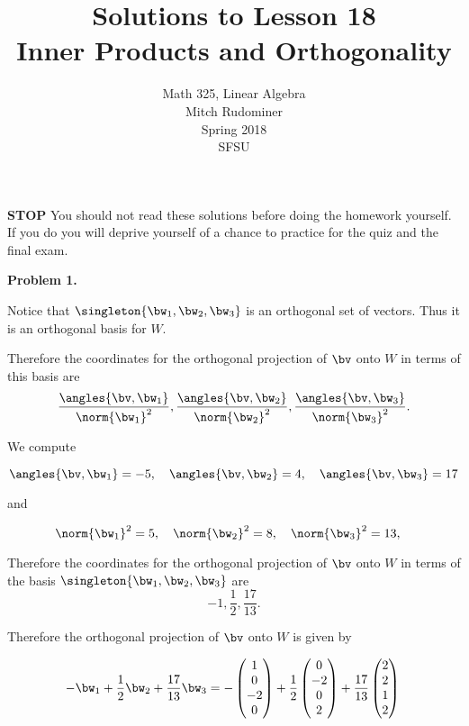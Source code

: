 \documentclass[oneside,12pt]{amsart}
\begin{document}
\title{Solutions to Lesson 18 \\ Inner Products and Orthogonality}
\author{Math 325, Linear Algebra \\ Mitch Rudominer \\ Spring 2018 \\ SFSU }
\date{}

\maketitle

\bigskip

\textbf{STOP} You should not read these solutions before doing the homework yourself.
If you do you will deprive yourself of a chance to practice for the quiz and the final exam.

\bigskip

\textbf{Problem 1.}

\bigskip

Notice that $\singleton{\bw_1,\bw_2,\bw_3}$ is an orthogonal set of vectors.
Thus it is an orthogonal basis for $W$.

Therefore the coordinates for the orthogonal projection of $\bv$ onto $W$ in terms of this basis are
$$\frac{\angles{\bv,\bw_1}}{\norm{\bw_1}^2}, \frac{\angles{\bv,\bw_2}}{\norm{\bw_2}^2},\frac{\angles{\bv,\bw_3}}{\norm{\bw_3}^2}.$$

\bigskip

We compute

$$\angles{\bv,\bw_1}= -5, \quad \angles{\bv,\bw_2}= 4 , \quad \angles{\bv,\bw_3}= 17$$

\bigskip

and

$$\norm{\bw_1}^2=5, \quad \norm{\bw_2}^2=8, \quad \norm{\bw_3}^2=13, \quad $$

\bigskip

Therefore the coordinates for the orthogonal projection of $\bv$ onto $W$ in terms of the basis $\singleton{\bw_1,\bw_2,\bw_3}$ are
$$-1, \frac{1}{2},\frac{17}{13}.$$

\bigskip

Therefore the orthogonal projection of $\bv$ onto $W$  is given by

$$
-\bw_1  +\frac{1}{2} \bw_2 + \frac{17}{13}\bw_3 =
-
\begin{pmatrix}
1  \\
0  \\
-2 \\
0
\end{pmatrix}
+
\frac{1}{2}
\begin{pmatrix}
0 \\
-2\\
0 \\
2
\end{pmatrix}
+
\frac{17}{13}
\begin{pmatrix}
2 \\
2 \\
1 \\
2
\end{pmatrix}\\
$$
\end{document}
